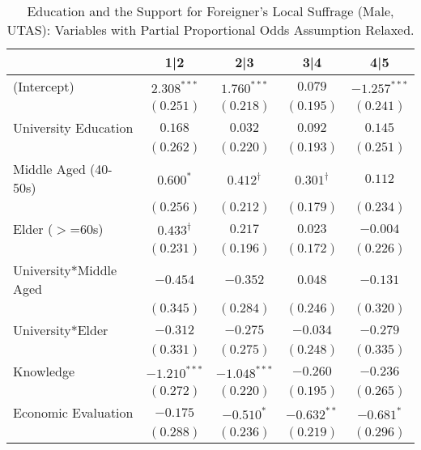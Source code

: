 
\begin{table}
\caption{Education and the Support for Foreigner's Local Suffrage (Male, UTAS): Variables with Partial Proportional Odds Assumption Relaxed.}
\begin{center}
\begin{tabular}{l c c c c }
\toprule
 & 1|2 & 2|3 & 3|4 & 4|5 \\
\midrule
(Intercept)            & $2.308^{***}$     & $1.760^{***}$     & $0.079$           & $-1.257^{***}$ \\
                       & $(0.251)$         & $(0.218)$         & $(0.195)$         & $(0.241)$      \\
University Education   & $0.168$           & $0.032$           & $0.092$           & $0.145$        \\
                       & $(0.262)$         & $(0.220)$         & $(0.193)$         & $(0.251)$      \\
Middle Aged (40-50s)   & $0.600^{*}$       & $0.412^{\dagger}$ & $0.301^{\dagger}$ & $0.112$        \\
                       & $(0.256)$         & $(0.212)$         & $(0.179)$         & $(0.234)$      \\
Elder ($>$=60s)        & $0.433^{\dagger}$ & $0.217$           & $0.023$           & $-0.004$       \\
                       & $(0.231)$         & $(0.196)$         & $(0.172)$         & $(0.226)$      \\
University*Middle Aged & $-0.454$          & $-0.352$          & $0.048$           & $-0.131$       \\
                       & $(0.345)$         & $(0.284)$         & $(0.246)$         & $(0.320)$      \\
University*Elder       & $-0.312$          & $-0.275$          & $-0.034$          & $-0.279$       \\
                       & $(0.331)$         & $(0.275)$         & $(0.248)$         & $(0.335)$      \\
Knowledge              & $-1.210^{***}$    & $-1.048^{***}$    & $-0.260$          & $-0.236$       \\
                       & $(0.272)$         & $(0.220)$         & $(0.195)$         & $(0.265)$      \\
Economic Evaluation    & $-0.175$          & $-0.510^{*}$      & $-0.632^{**}$     & $-0.681^{*}$   \\
                       & $(0.288)$         & $(0.236)$         & $(0.219)$         & $(0.296)$      \\

\end{tabular}
\end{center}
\end{table}
